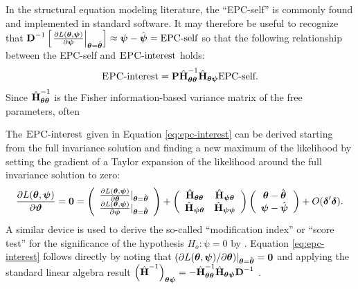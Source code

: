 \documentclass[letterpaper,12pt]{article}
\newcommand\vm[1]{%
\bm{\mathrm{#1}}}
\newcommand{\param}{\vm{\theta}}
\newcommand{\bpsi}{\vm{\psi}}
\newcommand{\that}{\hat{\vm{\theta}}}
\newcommand{\da}{\textrm{{\sc {EPC}}-interest}}
\begin{document}
In the structural equation modeling literature, the ``EPC-self'' is commonly found and implemented in standard software. It may therefore be useful to recognize that $\vm{D}^{-1}
		\left[ \left.\frac{\partial L(\param, \bpsi)}{\partial \bpsi}\right|_{\param = \that} \right] \approx \bpsi - \hat{\bpsi} = \text{EPC-self}$ so that the following relationship between the EPC-self and $\da{}$ holds:
\begin{equation}
\da = \vm{P} \hat{\vm{H}}^{-1}_{\param\param} \hat{\vm{H}}_{\param\bpsi} \text{EPC-self}.
\end{equation}
Since $\hat{\vm{H}}^{-1}_{\param\param}$ is the Fisher information-based variance matrix of the free parameters, often

The $\da{}$ given in Equation \ref{eq:epc-interest} can be derived  starting from the full invariance solution and finding a new maximum of the likelihood by setting the gradient of a Taylor expansion of the likelihood around the full invariance solution to zero:
\begin{equation}
 \frac{\partial L(\param, \bpsi)}{\partial \vm{\vartheta}}= \vm{0} = 
	\left( \begin{array}{cc}
	\frac{\partial L(\param, \bpsi) }{ \partial \param}|_{\param=\that}\\
	\frac{\partial L(\param, \bpsi) }{ \partial \bpsi}|_{\param=\that}\\
	\end{array} \right)  + 
	\left( \begin{array}{cc}
		\hat{\vm{H}}_{\param\param} & \hat{\vm{H}}_{\bpsi\param}\\
		\hat{\vm{H}}_{\bpsi\param} & \hat{\vm{H}}_{\bpsi\bpsi}\\
	\end{array} \right)  
		\left( \begin{array}{cc}
		\param - \that\\
		\bpsi - \hat{\bpsi}
	\end{array} \right)+
O(\vm{\delta}^\prime\vm{\delta}).
	\label{eq:gradient}
\end{equation}
A similar device is used to derive the so-called ``modification index'' or ``score test'' for the significance of the hypothesis $H_o: \bpsi = \vm{0}$ by \citet[e.g.][p. 373]{sorbom1989model}.
Equation \ref{eq:epc-interest}  follows directly by noting that $( \partial L(\param, \bpsi) / \partial \param ) |_{\param=\that} = \vm{0}$ and applying the standard linear algebra result  $\left(\hat{\vm{H}}^{-1}\right)_{\param\bpsi} = 	- \hat{\vm{H}}^{-1}_{\param\param} \hat{\vm{H}}_{\param\bpsi}\vm{D}^{-1}$ \citep[e.g.][p. 12]{magnus2007matrix}.
\end{document}
